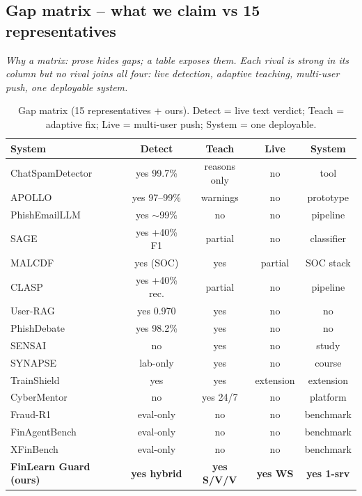 \documentclass[11pt,a4paper]{article}
\begin{document}
\subsection{Gap matrix -- what we claim vs 15 representatives}
\noindent\textit{Why a matrix: prose hides gaps; a table exposes them. Each rival is strong in its column but no rival joins all four: live detection, adaptive teaching, multi-user push, one deployable system.}

\begin{table}[h]\centering\caption{Gap matrix (15 representatives + ours). Detect = live text verdict; Teach = adaptive fix; Live = multi-user push; System = one deployable.}\label{tab:gap}
\begin{tabular}{@{}lcccc@{}}\toprule
System & Detect & Teach & Live & System \\\midrule
ChatSpamDetector \cite{Koide24} & yes 99.7\% & reasons only & no & tool \\
APOLLO \cite{Desolda24} & yes 97--99\% & warnings & no & prototype \\
PhishEmailLLM \cite{Nair25} & yes $\sim$99\% & no & no & pipeline \\
SAGE \cite{SAGE26} & yes +40\% F1 & partial & no & classifier \\
MALCDF \cite{MALCDF25} & yes (SOC) & yes & partial & SOC stack \\
CLASP \cite{CLASP25} & yes +40\% rec. & partial & no & pipeline \\
User-RAG \cite{UserRAG26} & yes 0.970 & yes & no & no \\
PhishDebate \cite{PhishDebate25} & yes 98.2\% & yes & no & no \\
SENSAI \cite{SENSAI25} & no & yes & no & study \\
SYNAPSE \cite{SYNAPSE26} & lab-only & yes & no & course \\
TrainShield \cite{TrainShield25} & yes & yes & extension & extension \\
CyberMentor \cite{CyberMentor25} & no & yes 24/7 & no & platform \\
Fraud-R1 \cite{FraudR125} & eval-only & no & no & benchmark \\
FinAgentBench \cite{FinAgentBench25} & eval-only & no & no & benchmark \\
XFinBench \cite{XFin25} & eval-only & no & no & benchmark \\
\textbf{FinLearn Guard (ours)} & \textbf{yes hybrid} & \textbf{yes S/V/V} & \textbf{yes WS} & \textbf{yes 1-srv} \\\bottomrule
\end{tabular}\end{table}
\end{document}
